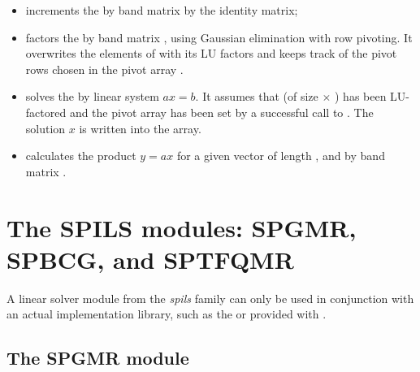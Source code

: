 \begin{itemize}
\item {}
  \par {} increments the  by  band matrix  by the
  identity matrix;

\item {}
  \par {} factors the  by  band matrix ,
  using Gaussian elimination with row pivoting. 
  It overwrites the elements of  with its LU factors and keeps track of the
  pivot rows chosen in the pivot array .

\item {}
  \par {} solves the  by  linear system $ax = b$. 
  It assumes that  (of size  $\times$ ) has been LU-factored 
  and the pivot array  has been set by a successful call to 
  . The solution $x$ is written into the  array.

\item {}
  \par {} calculates the product $y = ax$ for a given vector
   of length , and  by  band matrix .

\end{itemize}




\section{The SPILS modules: SPGMR, SPBCG, and SPTFQMR}\label{s:spils}

{\warn}A linear solver module from the {\em spils} family can only be used in conjunction 
with an actual {\nvector} implementation library, such as the {\nvecs} or {\nvecp} provided 
with {\sundials}.


\subsection{The SPGMR module}\label{ss:spgmr}

